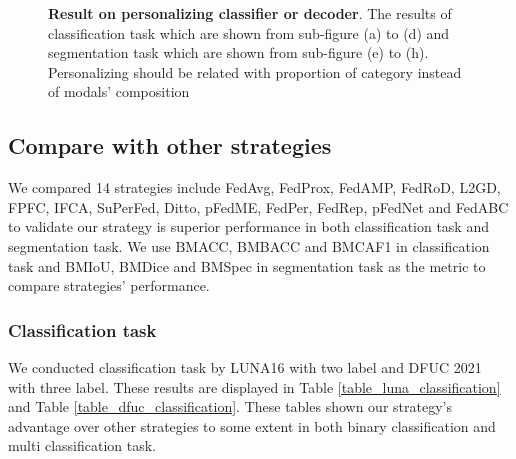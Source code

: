 \documentclass[journal]{IEEEtran}
\begin{document}
\begin{figure}
	\caption{\textbf{Result on personalizing classifier or decoder}. The results of classification task which are shown from sub-figure (a) to (d) and segmentation task which are shown from sub-figure (e) to (h). Personalizing should be related with proportion of category instead of modals' composition}
	\label{fig_luna_lambda_result}
\end{figure}

\subsection{Compare with other strategies}
We compared 14 strategies include FedAvg, FedProx, FedAMP, FedRoD, L2GD, FPFC, IFCA, SuPerFed, Ditto, pFedME, FedPer, FedRep, pFedNet and FedABC to validate our strategy is superior performance in both classification task and segmentation task. We use BMACC, BMBACC and BMCAF1  in classification task and BMIoU, BMDice and BMSpec in segmentation task as the metric to compare strategies' performance. 

\subsubsection{Classification task}

We conducted classification task by LUNA16 with two label and DFUC 2021 with three label. These results are displayed in Table \ref{table_luna_classification} and Table \ref{table_dfuc_classification}. These tables shown our strategy's advantage over other strategies to some extent in both binary classification and multi classification task. 
\end{document}
